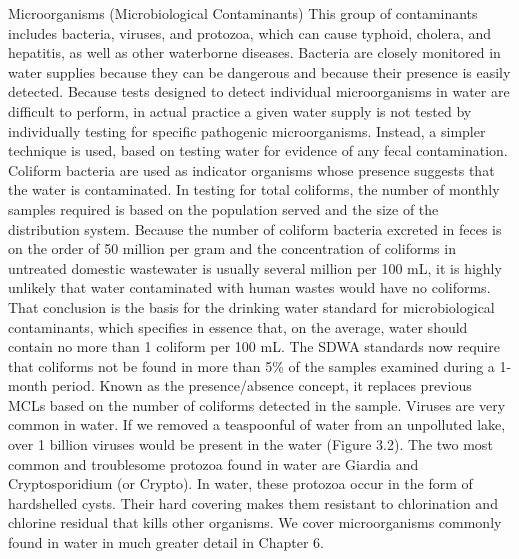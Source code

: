 \documentclass{article}
\begin{document}
Microorganisms (Microbiological Contaminants) This group of contaminants
includes bacteria, viruses, and protozoa, which can cause typhoid,
cholera, and hepatitis, as well as other waterborne diseases. Bacteria
are closely monitored in water supplies because they can be dangerous
and because their presence is easily detected. Because tests designed to
detect individual microorganisms in water are difficult to perform, in
actual practice a given water supply is not tested by individually
testing for specific pathogenic microorganisms. Instead, a simpler
technique is used, based on testing water for evidence of any fecal
contamination. Coliform bacteria are used as indicator organisms whose
presence suggests that the water is contaminated. In testing for total
coliforms, the number of monthly samples required is based on the
population served and the size of the distribution system. Because the
number of coliform bacteria excreted in feces is on the order of 50
million per gram and the concentration of coliforms in untreated
domestic wastewater is usually several million per 100 mL, it is highly
unlikely that water contaminated with human wastes would have no
coliforms. That conclusion is the basis for the drinking water standard
for microbiological contaminants, which specifies in essence that, on
the average, water should contain no more than 1 coliform per 100 mL.
The SDWA standards now require that coliforms not be found in more than
5\% of the samples examined during a 1-month period. Known as the
presence/absence concept, it replaces previous MCLs based on the number
of coliforms detected in the sample. Viruses are very common in water.
If we removed a teaspoonful of water from an unpolluted lake, over 1
billion viruses would be present in the water (Figure 3.2). The two most
common and troublesome protozoa found in water are Giardia and
Cryptosporidium (or Crypto). In water, these protozoa occur in the form
of hardshelled cysts. Their hard covering makes them resistant to
chlorination and chlorine residual that kills other organisms. We cover
microorganisms commonly found in water in much greater detail in Chapter
6.
\end{document}
